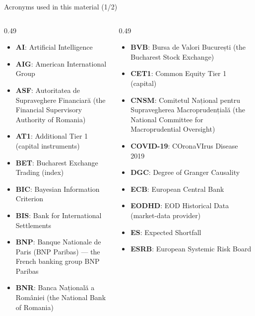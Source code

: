 
{
\begin{frame}[noframenumbering]
    \titlepage
\end{frame}
}
\begin{frame}{Acronyms used in this material (1/2)}
\begin{columns}[T]
\begin{column}{0.49\textwidth}
\begin{itemize}\setlength{\itemsep}{0pt}
    \item \textbf{AI}: Artificial Intelligence
    \item \textbf{AIG}: American International Group
    \item \textbf{ASF}: Autoritatea de Supraveghere Financiară (the Financial Supervisory Authority of Romania)
    \item \textbf{AT1}: Additional Tier 1 (capital instruments)
    \item \textbf{BET}: Bucharest Exchange Trading (index)
    \item \textbf{BIC}: Bayesian Information Criterion
    \item \textbf{BIS}: Bank for International Settlements
    \item \textbf{BNP}: Banque Nationale de Paris (BNP Paribas) — the French banking group BNP Paribas
    \item \textbf{BNR}: Banca Națională a României (the National Bank of Romania)
\end{itemize}
\end{column}
\begin{column}{0.49\textwidth}
\begin{itemize}\setlength{\itemsep}{0pt}
    \item \textbf{BVB}: Bursa de Valori București (the Bucharest Stock Exchange)
    \item \textbf{CET1}: Common Equity Tier 1 (capital)
    \item \textbf{CNSM}: Comitetul Național pentru Supravegherea Macroprudențială (the National Committee for Macroprudential Oversight)
    \item \textbf{COVID-19}: COronaVIrus Disease 2019
    \item \textbf{DGC}: Degree of Granger Causality
    \item \textbf{ECB}: European Central Bank
    \item \textbf{EODHD}: EOD Historical Data (market-data provider)
    \item \textbf{ES}: Expected Shortfall
    \item \textbf{ESRB}: European Systemic Risk Board
\end{itemize}
\end{column}
\end{columns}
\end{frame}
